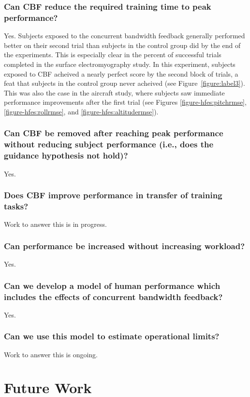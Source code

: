 \subsubsection{Can CBF reduce the required training time to peak performance?}
Yes.
Subjects exposed to the concurrent bandwidth feedback generally performed better on their second trial than subjects in the control group did by the end of the experiments.
This is especially clear in the percent of successful trials completed in the surface electromyography study.
In this experiment, subjects exposed to CBF acheived a nearly perfect score by the second block of trials, a feat that subjects in the control group never acheived (see Figure~\ref{figure:label3}).
This was also the case in the aircraft study, where subjects saw immediate performance improvements after the first trial (see Figures \ref{figure-hfes:pitchrmse}, \ref{figure-hfes:rollrmse}, and \ref{figure-hfes:altitudermse}).

\subsubsection{Can CBF be removed after reaching peak performance without reducing subject performance (i.e., does the guidance hypothesis not hold)?}
Yes.

\subsubsection{Does CBF improve performance in transfer of training tasks?}
Work to answer this is in progress.

\subsubsection{Can performance be increased without increasing workload?}
Yes.

\subsubsection{Can we develop a model of human performance which includes the effects of concurrent bandwidth feedback?}
Yes.

\subsubsection{Can we use this model to estimate operational limits?}
Work to answer this is ongoing.


\section{Future Work}

